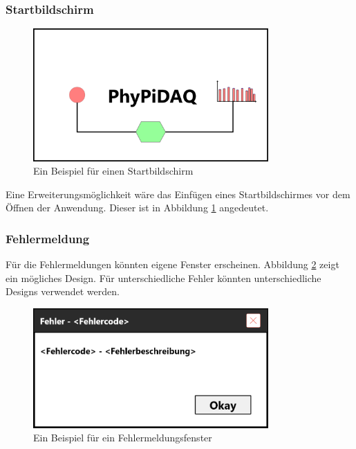 \documentclass[parskip=full]{scrartcl}
\begin{document}
\subsubsection{Startbildschirm}

\begin{figure}[htbp]
	\begin{center}
		\includegraphics[width = 9cm]{Grafik/Startbildschirm.png}
		\caption{Ein Beispiel für einen Startbildschirm}
		\label{startbildschirm}
	\end{center}
\end{figure}

Eine Erweiterungsmöglichkeit wäre das Einfügen eines Startbildschirmes vor dem Öffnen der Anwendung. Dieser ist in Abbildung \ref{startbildschirm} angedeutet.

\subsubsection{Fehlermeldung}

Für die Fehlermeldungen könnten eigene Fenster erscheinen. Abbildung \ref{fehlerfenster} zeigt ein mögliches Design. Für unterschiedliche Fehler könnten unterschiedliche Designs verwendet werden.

\begin{figure}[htbp]
	\begin{center}
		\includegraphics[width = 9cm]{Grafik/Fehlerfenster}
		\caption{Ein Beispiel für ein Fehlermeldungsfenster}
		\label{fehlerfenster}
	\end{center}
\end{figure}
\end{document}
